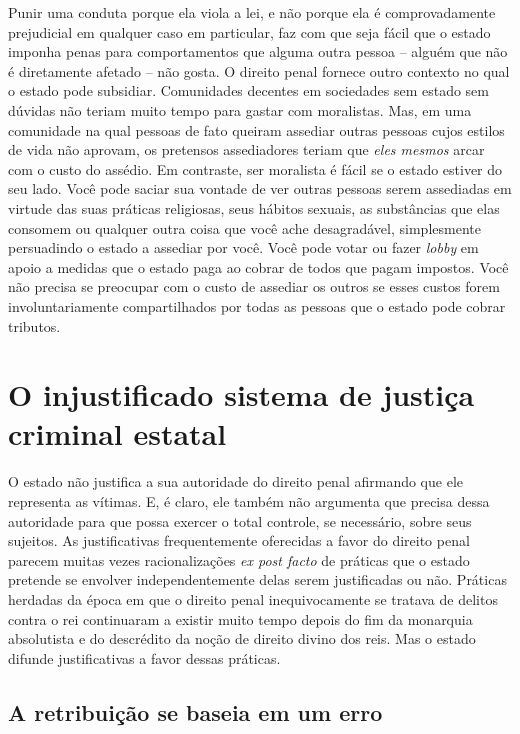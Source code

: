 Punir uma conduta porque ela viola a lei, e não porque ela é comprovadamente prejudicial em qualquer caso em particular, faz com que seja fácil que o estado imponha penas para comportamentos que alguma outra pessoa -- alguém que não é diretamente afetado -- não gosta. O direito penal fornece outro contexto no qual o estado pode subsidiar. Comunidades decentes em sociedades sem estado sem dúvidas não teriam muito tempo para gastar com moralistas. Mas, em uma comunidade na qual pessoas de fato queiram assediar outras pessoas cujos estilos de vida não aprovam, os pretensos assediadores teriam que \emph{eles mesmos} arcar com o custo do assédio. Em contraste, ser moralista é fácil se o estado estiver do seu lado. Você pode saciar sua vontade de ver outras pessoas serem assediadas em virtude das suas práticas religiosas, seus hábitos sexuais, as substâncias que elas consomem ou qualquer outra coisa que você ache desagradável, simplesmente persuadindo o estado a assediar por você. Você pode votar ou fazer \emph{lobby} em apoio a medidas que o estado paga ao cobrar de todos que pagam impostos. Você não precisa se preocupar com o custo de assediar os outros se esses custos forem involuntariamente compartilhados por todas as pessoas que o estado pode cobrar tributos.

\section{O injustificado sistema de justiça criminal estatal}

O estado não justifica a sua autoridade do direito penal afirmando que ele representa as vítimas. E, é claro, ele também não argumenta que precisa dessa autoridade para que possa exercer o total controle, se necessário, sobre seus sujeitos. As justificativas frequentemente oferecidas a favor do direito penal parecem muitas vezes racionalizações \emph{ex post facto} de práticas que o estado pretende se envolver independentemente delas serem justificadas ou não. Práticas herdadas da época em que o direito penal inequivocamente se tratava de delitos contra o rei continuaram a existir muito tempo depois do fim da monarquia absolutista e do descrédito da noção de direito divino dos reis. Mas o estado difunde justificativas a favor dessas práticas.

\subsection*{A retribuição se baseia em um erro}

